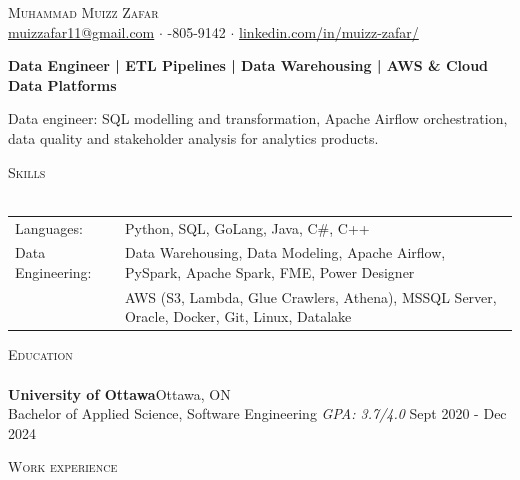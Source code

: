 \documentclass[a4paper]{article}
\newcommand{\lineunder} {
    \vspace*{-8pt} \\
    \hspace*{-18pt} \hrulefill \\
}
\newcommand{\header} [1] {
    {\hspace*{-18pt}\vspace*{6pt} \textsc{#1}}
    \vspace*{-6pt} \lineunder
}
\begin{document}
\vspace*{-40pt}

    

\vspace*{-10pt}
\begin{center}
	{\Huge \scshape {Muhammad Muizz Zafar}}\\
	\faSend \space \href{mailto:muizzafar11@gmail.com}{muizzafar11@gmail.com} $\cdot$ \faPhoneSquare {}-805-9142 $\cdot$ \faLinkedinSquare \space \href{https://www.linkedin.com/in/muizz-zafar/}{linkedin.com/in/muizz-zafar/}
	\\
\end{center}


\vspace{-5pt}
\begin{center}
\textbf{Data Engineer | ETL Pipelines | Data Warehousing | AWS \& Cloud Data Platforms}
\end{center}
\begin{center}
Data engineer: SQL modelling and transformation, Apache Airflow orchestration, data quality and stakeholder analysis for analytics products.
\end{center}

\header{Skills}
\begin{tabular}{ l l }
	Languages: 
& Python, SQL, GoLang, Java, C\#, C++ \\

Data Engineering: 
& Data Warehousing, Data Modeling, Apache Airflow, PySpark, Apache Spark, FME, Power Designer\\
& AWS (S3, Lambda, Glue Crawlers, Athena), MSSQL Server, Oracle, Docker, Git, Linux, Datalake

\end{tabular}

\header{Education}
\textbf{University of Ottawa}\hfill Ottawa, ON\\
Bachelor of Applied Science, Software Engineering \textit{GPA: 3.7/4.0} \hfill Sept 2020 - Dec 2024\\
\vspace{2mm}

\header{Work experience}
\vspace{1.5mm}
\end{document}
